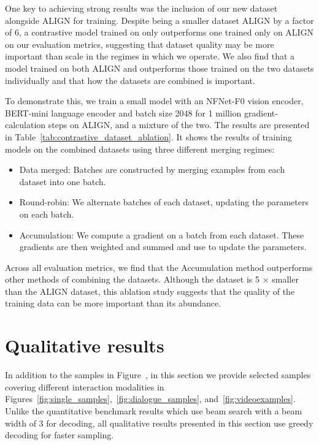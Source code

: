 

One key to achieving strong results was the inclusion of our new dataset \shortimagetextpairs{} alongside ALIGN for training. Despite being a smaller dataset ALIGN by a factor of 6, a contrastive model trained on only \shortimagetextpairs{} outperforms one trained only on ALIGN on our evaluation metrics, suggesting that dataset quality may be more important than scale in the regimes in which we operate. We also find that a model trained on both ALIGN and \shortimagetextpairs{} outperforms those trained on the two datasets individually and that how the datasets are combined is important. 

To demonstrate this, we train a small model with an NFNet-F0 vision encoder, BERT-mini language encoder and batch size 2048 for 1 million gradient-calculation steps on ALIGN, \shortimagetextpairs{} and a mixture of the two. The results are presented in Table~\ref{tab:contrastive_dataset_ablation}. It shows the results of training models on the combined datasets using three different merging regimes:


\begin{itemize}
    \item Data merged: Batches are constructed by merging examples from each dataset into one batch.
    \item Round-robin: We alternate batches of each dataset, updating the parameters on each batch.
    \item Accumulation: We compute a gradient on a batch from each dataset. These gradients are then weighted and summed and use to update the parameters.
\end{itemize}

Across all evaluation metrics, we find that the Accumulation method outperforms other methods of combining the datasets.
Although the \shortimagetextpairs{} dataset is 5 $\times$ smaller than the ALIGN dataset, this ablation study suggests that the quality of the training data can be more important than its abundance.




\section{Qualitative results}

\label{app:qual_res}

In addition to the samples in Figure~,
in this section we provide selected samples covering different interaction modalities in Figures~\ref{fig:single_samples},~\ref{fig:dialogue_samples}, and~\ref{fig:videoexamples}. Unlike the quantitative benchmark results which use beam search with a beam width of 3 for decoding, all qualitative results presented in this section use greedy decoding for faster sampling.

